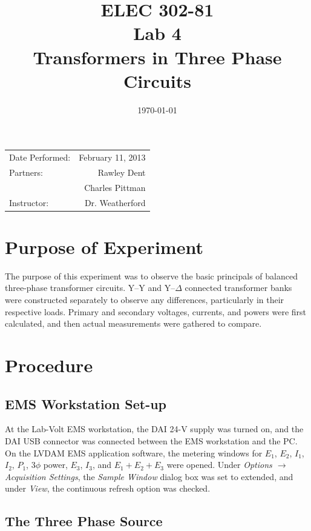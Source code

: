 \documentclass{article}
\title{ELEC 302-81\\ Lab 4\\ Transformers in Three Phase Circuits}
\date{\today}
\begin{document}
\maketitle

\begin{center}
  \begin{tabular}{lr}
    Date Performed: & February 11, 2013 \\
    Partners: & Rawley Dent \\
              & Charles Pittman \\
    Instructor: & Dr. Weatherford
  \end{tabular}
\end{center}

\pagebreak

\setlength\parindent{0pt}

\section{Purpose of Experiment}

The purpose of this experiment was to observe the basic principals of balanced
three-phase transformer circuits. Y--Y and Y--$\Delta$ connected transformer
banks were constructed separately to observe any differences, particularly in
their respective loads. Primary and secondary voltages, currents, and powers
were first calculated, and then actual measurements were gathered to compare.

\section{Procedure}

\subsection{EMS Workstation Set-up}

At the Lab-Volt EMS workstation, the DAI 24-V supply was turned on, and the DAI
USB connector was connected between the EMS workstation and the {PC}. On the
LVDAM EMS application software, the metering windows for $E_1$, $E_2$, $I_1$,
$I_2$, $P_1$, 3$\phi$ power, $E_3$, $I_3$, and $E_1 + E_2 + E_3$ were
opened.  Under \emph{Options $\to$ Acquisition Settings}, the \emph{Sample
Window} dialog box was set to extended, and under \emph{View}, the
continuous refresh option was checked.

\subsection{The Three Phase Source}
\end{document}
